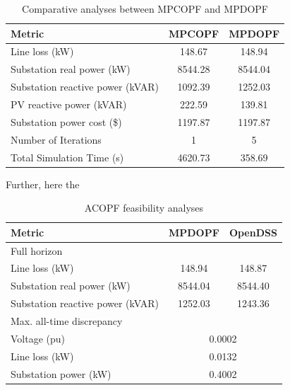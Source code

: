 \documentclass[../../outputs/main.tex]{subfiles}
\begin{document}
\begin{table}[h!]
    \centering
    \caption{Comparative analyses between MPCOPF and MPDOPF}
    \begin{tabular}{|l|c|c|}
    \hline
    \textbf{Metric} & \textbf{MPCOPF} & \textbf{MPDOPF} \\ \hline
    Line loss (kW) & 148.67 & 148.94 \\ \hline
    Substation real power (kW) & 8544.28 & 8544.04 \\ \hline
    Substation reactive power (kVAR) & 1092.39 & 1252.03 \\ \hline
    PV reactive power (kVAR) & 222.59 & 139.81 \\ \hline
    Substation power cost (\$) & 1197.87 & 1197.87 \\ \hline
    Number of Iterations & 1 & 5 \\ \hline
    Total Simulation Time (s) & 4620.73 & 358.69 \\ \hline
    \end{tabular}
    \label{table:opt-10-20-30}
\end{table}



Further, here the 

\begin{table}[h!]
    \centering
    \caption{ACOPF feasibility analyses}
    \begin{tabular}{|l|c|c|}
    \hline
    \textbf{Metric} & \textbf{MPDOPF} & \textbf{OpenDSS} \\ \hline
    Full horizon  & \multicolumn{2}{c|}{} \\ \hline
    \quad Line loss (kW) & 148.94 & 148.87 \\ \hline
    \quad Substation real power (kW) & 8544.04 & 8544.40 \\ \hline
    \quad Substation reactive power (kVAR) & 1252.03 & 1243.36 \\ \hline
    Max. all-time discrepancy & \multicolumn{2}{c|}{} \\ \hline
    \quad Voltage (pu) & \multicolumn{2}{c|}{0.0002} \\ \hline
    \quad Line loss (kW) & \multicolumn{2}{c|}{0.0132} \\ \hline
    \quad Substation power (kW) & \multicolumn{2}{c|}{0.4002} \\ \hline
    \end{tabular}
    \label{table:feas-copf-10-20-30}
\end{table}
\end{document}
